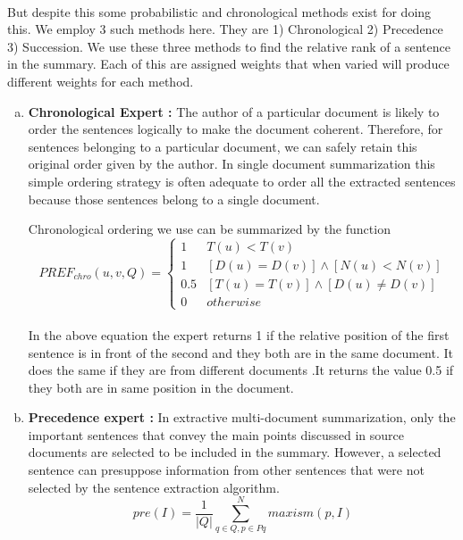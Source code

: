 \paragraph{}	But despite this some probabilistic and chronological methods exist for doing this. We employ 3 such methods here. They are 1) Chronological 2) Precedence 3) Succession. We use these three methods to find the relative rank of a sentence in the summary. Each of this are assigned weights that when varied will produce different weights for each method.
\begin{enumerate}[a. ]
\item \textbf{Chronological Expert :} \newline The author of a particular document is likely to order the sentences logically to make the document coherent. Therefore, for sentences belonging to a particular document, we can safely retain this original order given by the author. In single document summarization this simple ordering strategy is often adequate to order all the extracted sentences because those sentences belong to a single document.

Chronological ordering we use can be summarized by the function 
\begin{equation}
PREF_{chro}(u,v,Q) = \begin{cases}
	1 & T(u) < T(v)\\
	1 & [D(u) = D(v)] \wedge [N(u) < N(v)]\\
	0.5 & [T(u) = T(v)] \wedge [D(u) \neq D(v)]\\
	0 & otherwise
\end{cases} 
\end{equation}
\paragraph{} In the above equation the expert returns 1 if the relative position of the first 	sentence is in front of the second and they both are in the same document. It does the 		same if they are from different documents .It returns the value 0.5 if they both are in 	same position in the document.
\item \textbf{Precedence expert :} In extractive multi-document summarization, only the important sentences that convey the main points discussed in source documents are selected to be included in the summary. However, a selected sentence can presuppose information from other sentences that were not selected by the sentence extraction algorithm.
\begin{equation}
pre(I) = \frac{1}{|Q|}\sum_{q \in Q, p \in Pq}^{N} maxism(p,I)
\end{equation}

\end{enumerate}
